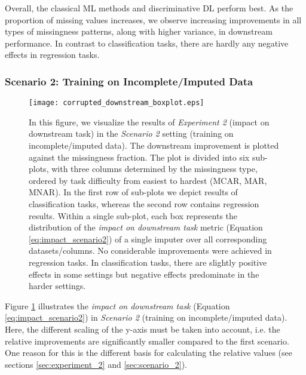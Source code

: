 Overall, the classical ML methods and discriminative DL perform best. As the proportion of missing values increases, we observe increasing improvements in all types of missingness patterns, along with higher variance, in downstream performance. In contrast to classification tasks, there are hardly any negative effects in regression tasks.

\subsubsection{Scenario 2: Training on Incomplete/Imputed Data}



\begin{figure}\centering
	\texttt{[image: corrupted\_downstream\_boxplot.eps]}

	\caption[Downstream Ranks - Corrupted]{In this figure, we visualize the results of \textit{Experiment 2} (impact on downstream task) in the \textit{Scenario 2} setting (training on incomplete/imputed data). The downstream improvement is plotted against the missingness fraction. The plot is divided into six sub-plots, with three columns determined by the missingness type, ordered by task difficulty from easiest to hardest (MCAR, MAR, MNAR). In the first row of sub-plots we depict results of classification tasks, whereas the second row contains regression results. Within a single sub-plot, each box represents the distribution of the \textit{impact on downstream task} metric (Equation \ref{eq:impact_scenario2}) of a single imputer over all corresponding datasets/columns. No considerable improvements were achieved in regression tasks. In classification tasks, there are slightly positive effects in some settings but negative effects predominate in the harder settings.
    }
	\label{fig:corrupted_downstream_boxplot}
\end{figure}

Figure \ref{fig:corrupted_downstream_boxplot} illustrates the \textit{impact on downstream task} (Equation \ref{eq:impact_scenario2}) in \textit{Scenario 2} (training on incomplete/imputed data). Here, the different scaling of the y-axis must be taken into account, i.e. the relative improvements are significantly smaller compared to the first scenario. One reason for this is the different basis for calculating the relative values (see sections \ref{sec:experiment_2} and \ref{sec:scenario_2}).  

